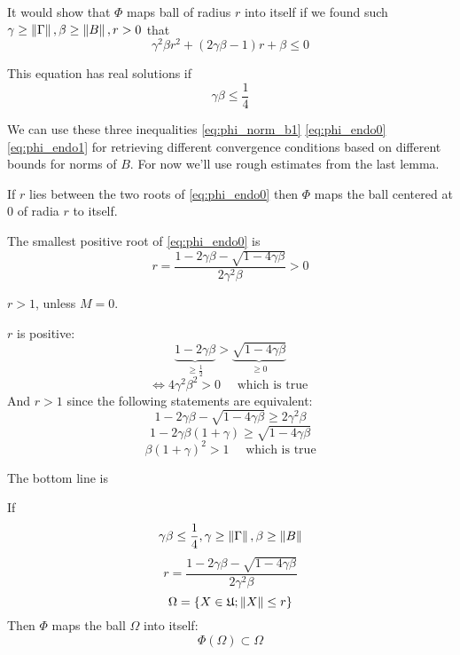 \documentclass{article}
\begin{document}
    It would show that $\Phi$ maps ball of radius $r$ into itself
    if we found such $\gamma\geq\left\|{\Gamma}\right\|, \beta\geq\left\|{B}\right\|, r>0$
    that
\begin{equation}\label{eq:phi_endo0}
    \gamma^2\beta r^2 + (2\gamma\beta - 1) r + \beta \leq 0
\end{equation}

This equation has real solutions if
\begin{equation}\label{eq:phi_endo1}
    \gamma\beta\leq\frac14
\end{equation}

We can use these three inequalities \eqref{eq:phi_norm_b1} \eqref{eq:phi_endo0} \eqref{eq:phi_endo1}
for retrieving different convergence conditions based on different bounds for norms of $B$.
For now we'll use rough estimates from the last lemma.

\begin{propose}
    If $r$ lies between the two roots of \eqref{eq:phi_endo0}
    then $\Phi$ maps the ball centered at $0$ of radia $r$ to itself.

    The smallest positive root of \eqref{eq:phi_endo0} is
    \begin{equation}\label{eq:endo_r0}
        r = \frac{1 - 2\gamma\beta - \sqrt{1-4\gamma\beta}}{2 \gamma^2 \beta} > 0
    \end{equation}

    $r>1$, unless $M=0$.
\end{propose}
\begin{TRIVIA}
    $r$ is positive:
    $$\underbrace{1-2\gamma\beta}_{\geq\frac12} > \underbrace{\sqrt{1-4\gamma\beta}}_{\geq0}$$
    $$\iff 4\gamma^2\beta^2 > 0 \quad\text{ which is true }$$
    And $r>1$ since the following statements are equivalent:
    $$1 - 2\gamma\beta - \sqrt{1-4\gamma\beta} \geq 2 \gamma^2 \beta$$
    $$1 - 2\gamma\beta(1 +  \gamma) \geq \sqrt{1-4\gamma\beta}$$
    $$\beta(1+\gamma)^2>1 \quad\text{ which is true}$$
\end{TRIVIA}

The bottom line is
\begin{thm}\label{thm:endo}
    If
    $$\gamma\beta\leq\frac14, \gamma\geq\left\|{\Gamma}\right\|, \beta\geq\left\|{B}\right\|$$
    $$r = \frac{1 - 2\gamma\beta - \sqrt{1-4\gamma\beta}}{2 \gamma^2 \beta}$$
    $$\Omega = \{ X\in\mathfrak U; \left\|{X}\right\| \leq r \}$$
    Then
    $\Phi$ maps the ball $\Omega$ into itself:
    $$\Phi(\Omega)\subset\Omega$$
\end{thm}
\end{document}
